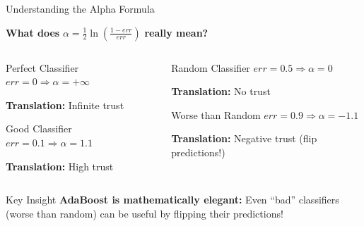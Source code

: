 \documentclass[8pt]{beamer}
\begin{document}
\begin{frame}{Understanding the Alpha Formula}
\begin{keypointsbox}
\textbf{What does } $\alpha = \frac{1}{2}\ln\left(\frac{1-err}{err}\right)$ \textbf{ really mean?}
\end{keypointsbox}

\begin{columns}
\begin{column}{0.5\textwidth}
\begin{definitionbox}{Perfect Classifier}
$err = 0 \Rightarrow \alpha = +\infty$

\textbf{Translation:} Infinite trust
\end{definitionbox}

\begin{examplebox}{Good Classifier}
$err = 0.1 \Rightarrow \alpha = 1.1$

\textbf{Translation:} High trust
\end{examplebox}
\end{column}

\begin{column}{0.5\textwidth}
\begin{alertbox}{Random Classifier}
$err = 0.5 \Rightarrow \alpha = 0$

\textbf{Translation:} No trust
\end{alertbox}

\begin{alertbox}{Worse than Random}
$err = 0.9 \Rightarrow \alpha = -1.1$

\textbf{Translation:} Negative trust (flip predictions!)
\end{alertbox}
\end{column}
\end{columns}

\begin{examplebox}{Key Insight}
\textbf{AdaBoost is mathematically elegant:} Even ``bad'' classifiers (worse than random) can be useful by flipping their predictions!
\end{examplebox}
\end{frame}
\end{document}

